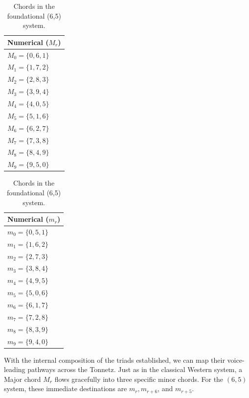 \documentclass[11pt,letterpaper]{amsart}
\begin{document}
{\tiny \begin{table}[H]
    \centering
    \begin{minipage}{0.48\textwidth}
        \centering
        \begin{tabular}{l}
        \toprule
        \textbf{Numerical ($M_r$)} \\
        \midrule
        $M_0 = \{0, 6, 1\}$ \\
        $M_1 = \{1, 7, 2\}$ \\
        $M_2 = \{2, 8, 3\}$ \\
        $M_3 = \{3, 9, 4\}$ \\
        $M_4 = \{4, 0, 5\}$ \\
        $M_5 = \{5, 1, 6\}$ \\
        $M_6 = \{6, 2, 7\}$ \\
        $M_7 = \{7, 3, 8\}$ \\
        $M_8 = \{8, 4, 9\}$ \\
        $M_9 = \{9, 5, 0\}$ \\
        \bottomrule
        \end{tabular}
    \end{minipage}\hfill
    \begin{minipage}{0.48\textwidth}
        \centering
        \begin{tabular}{l}
        \toprule
        \textbf{Numerical ($m_r$)} \\
        \midrule
        $m_0 = \{0, 5, 1\}$ \\
        $m_1 = \{1, 6, 2\}$ \\
        $m_2 = \{2, 7, 3\}$ \\
        $m_3 = \{3, 8, 4\}$ \\
        $m_4 = \{4, 9, 5\}$ \\
        $m_5 = \{5, 0, 6\}$ \\
        $m_6 = \{6, 1, 7\}$ \\
        $m_7 = \{7, 2, 8\}$ \\
        $m_8 = \{8, 3, 9\}$ \\
        $m_9 = \{9, 4, 0\}$ \\
        \bottomrule
        \end{tabular}
    \end{minipage}
    \caption{Chords in the foundational (6,5) system.}
\end{table}}

With the internal composition of the triads established, we can map their voice-leading pathways across the Tonnetz. Just as in the classical Western system, a Major chord $M_r$ flows gracefully into three specific minor chords. For the $(6,5)$ system, these immediate destinations are $m_r, m_{r+6}$, and $m_{r+5}$.
\end{document}
